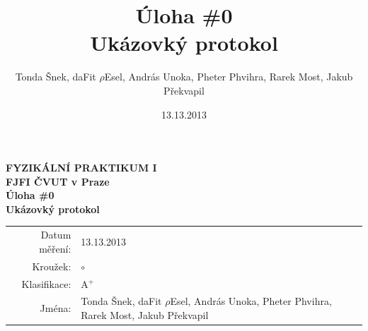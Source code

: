 \documentclass[english]{article}
\newcommand{\Author}{Tonda Šnek, daFit $\rho$Esel, András Unoka, Pheter Phvihra, Rarek Most, Jakub Překvapil}
\newcommand{\Institute}{FJFI ČVUT v Praze}
\newcommand{\Subject}{FYZIKÁLNÍ PRAKTIKUM I}
\newcommand{\Group}{7}
\newcommand{\Circle}{ZS 5}
\newcommand{\Title}{Úloha \#0  \\Ukázovký protokol}
\newcommand{\Date}{13.13.2013}
\begin{document}
\author{\Author}
\title{\Title}
\date{\Date}

\renewcommand{\figurename}{Obr.}
\renewcommand{\tablename}{Tab.}
\renewcommand{\refname}{Reference}
\renewcommand*\abstractname{Věnování}


\setlength{\parindent}{0cm}
\begin{multicols}{2}
\textbf{\Subject \\
        \Institute \\[0.1cm]
\Title \\[0.5cm]
}
\begin{tabular}{rl} %
\large Datum měření: & \Date \\ %
\large Kroužek: & $\circ$ \\ %
\large Klasifikace: & A$^+$ \\
\large Jména: & \Author \\ %
\end{tabular}


\end{multicols}
\end{document}
